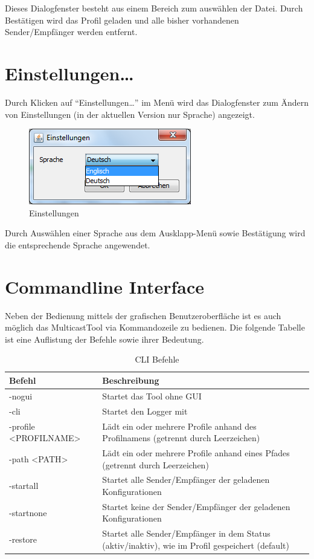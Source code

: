 Dieses Dialogfenster besteht aus einem Bereich zum auswählen der Datei. Durch
Bestätigen wird das Profil geladen und alle bisher vorhandenen Sender/Empfänger
werden entfernt.

\chapter{Einstellungen\ldots}
Durch Klicken auf ``Einstellungen\ldots'' im Menü wird das Dialogfenster zum
Ändern von Einstellungen (in der aktuellen Version nur Sprache) angezeigt. 

\begin{figure}[htbp]
\begin{center}
\includegraphics{images/options.png}
\caption[Einstellungen]{Einstellungen}
\label{options}
\end{center}
\end{figure}

Durch Auswählen einer Sprache aus dem Ausklapp-Menü sowie Bestätigung wird die
entsprechende Sprache angewendet.

\chapter{Commandline Interface}
Neben der Bedienung mittels der grafischen Benutzeroberfläche ist es auch
möglich das MulticastTool via Kommandozeile zu bedienen.
Die folgende Tabelle ist eine Auflistung der Befehle sowie ihrer
Bedeutung.

\begin{table}[h]
\caption{CLI Befehle}
\label{tab:cli}
\begin{center}
\begin{tabular}{|p{6cm}|p{8cm}|}
\hline
\textbf{Befehl} & \textbf{Beschreibung}\\
\hline
-nogui & Startet das Tool ohne GUI\\
\hline
-cli & Startet den Logger mit\\
\hline
-profile <PROFILNAME> & Lädt ein oder mehrere Profile anhand des
Profilnamens (getrennt durch Leerzeichen)\\
\hline
-path <PATH> & Lädt ein oder mehrere Profile anhand eines Pfades (getrennt durch
Leerzeichen)\\
\hline
-startall & Startet alle Sender/Empfänger der geladenen Konfigurationen\\
\hline
-startnone & Startet keine der Sender/Empfänger der geladenen Konfigurationen\\
\hline
-restore & Startet alle Sender/Empfänger in dem Status (aktiv/inaktiv), wie im
Profil gespeichert (default)\\
\hline
\end{tabular}
\end{center}
\label{default}
\end{table}